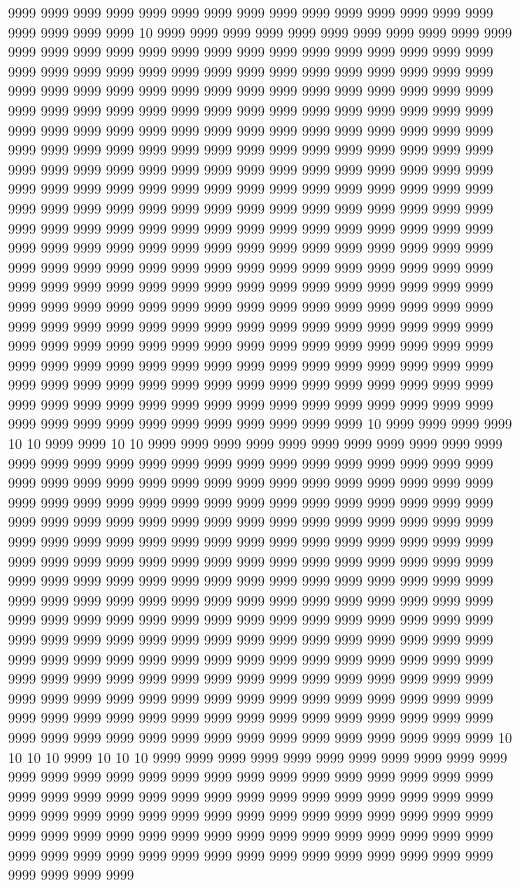 9999 9999 9999 9999 9999 9999 9999 9999 9999 9999 9999 9999 9999 9999 9999 9999 9999 9999 9999 10 9999 9999 9999 9999 9999 9999 9999 9999 9999 9999 9999 9999 9999 9999 9999 9999 9999 9999 9999 9999 9999 9999 9999 9999 9999 9999 9999 9999 9999 9999 9999 9999 9999 9999 9999 9999 9999 9999 9999 9999 9999 9999 9999 9999 9999 9999 9999 9999 9999 9999 9999 9999 9999 9999 9999 9999 9999 9999 9999 9999 9999 9999 9999 9999 9999 9999 9999 9999 9999 9999 9999 9999 9999 9999 9999 9999 9999 9999 9999 9999 9999 9999 9999 9999 9999 9999 9999 9999 9999 9999 9999 9999 9999 9999 9999 9999 9999 9999 9999 9999 9999 9999 9999 9999 9999 9999 9999 9999 9999 9999 9999 9999 9999 9999 9999 9999 9999 9999 9999 9999 9999 9999 9999 9999 9999 9999 9999 9999 9999 9999 9999 9999 9999 9999 9999 9999 9999 9999 9999 9999 9999 9999 9999 9999 9999 9999 9999 9999 9999 9999 9999 9999 9999 9999 9999 9999 9999 9999 9999 9999 9999 9999 9999 9999 9999 9999 9999 9999 9999 9999 9999 9999 9999 9999 9999 9999 9999 9999 9999 9999 9999 9999 9999 9999 9999 9999 9999 9999 9999 9999 9999 9999 9999 9999 9999 9999 9999 9999 9999 9999 9999 9999 9999 9999 9999 9999 9999 9999 9999 9999 9999 9999 9999 9999 9999 9999 9999 9999 9999 9999 9999 9999 9999 9999 9999 9999 9999 9999 9999 9999 9999 9999 9999 9999 9999 9999 9999 9999 9999 9999 9999 9999 9999 9999 9999 9999 9999 9999 9999 9999 9999 9999 9999 9999 9999 9999 9999 9999 9999 9999 9999 9999 9999 9999 9999 9999 9999 9999 9999 9999 9999 9999 9999 9999 9999 9999 9999 9999 9999 9999 9999 9999 9999 9999 9999 9999 9999 9999 9999 9999 9999 9999 9999 9999 9999 9999 9999 9999 9999 9999 9999 9999 9999 9999 9999 9999 9999 10 9999 9999 9999 9999 10 10 9999 9999 10 10 9999 9999 9999 9999 9999 9999 9999 9999 9999 9999 9999 9999 9999 9999 9999 9999 9999 9999 9999 9999 9999 9999 9999 9999 9999 9999 9999 9999 9999 9999 9999 9999 9999 9999 9999 9999 9999 9999 9999 9999 9999 9999 9999 9999 9999 9999 9999 9999 9999 9999 9999 9999 9999 9999 9999 9999 9999 9999 9999 9999 9999 9999 9999 9999 9999 9999 9999 9999 9999 9999 9999 9999 9999 9999 9999 9999 9999 9999 9999 9999 9999 9999 9999 9999 9999 9999 9999 9999 9999 9999 9999 9999 9999 9999 9999 9999 9999 9999 9999 9999 9999 9999 9999 9999 9999 9999 9999 9999 9999 9999 9999 9999 9999 9999 9999 9999 9999 9999 9999 9999 9999 9999 9999 9999 9999 9999 9999 9999 9999 9999 9999 9999 9999 9999 9999 9999 9999 9999 9999 9999 9999 9999 9999 9999 9999 9999 9999 9999 9999 9999 9999 9999 9999 9999 9999 9999 9999 9999 9999 9999 9999 9999 9999 9999 9999 9999 9999 9999 9999 9999 9999 9999 9999 9999 9999 9999 9999 9999 9999 9999 9999 9999 9999 9999 9999 9999 9999 9999 9999 9999 9999 9999 9999 9999 9999 9999 9999 9999 9999 9999 9999 9999 9999 9999 9999 9999 9999 9999 9999 9999 9999 9999 9999 9999 9999 9999 9999 9999 9999 9999 9999 9999 9999 9999 9999 9999 9999 9999 9999 9999 9999 9999 9999 9999 9999 9999 10 10 10 10 9999 10 10 10 9999 9999 9999 9999 9999 9999 9999 9999 9999 9999 9999 9999 9999 9999 9999 9999 9999 9999 9999 9999 9999 9999 9999 9999 9999 9999 9999 9999 9999 9999 9999 9999 9999 9999 9999 9999 9999 9999 9999 9999 9999 9999 9999 9999 9999 9999 9999 9999 9999 9999 9999 9999 9999 9999 9999 9999 9999 9999 9999 9999 9999 9999 9999 9999 9999 9999 9999 9999 9999 9999 9999 9999 9999 9999 9999 9999 9999 9999 9999 9999 9999 9999 9999 9999 9999 9999 9999 9999 9999 9999 